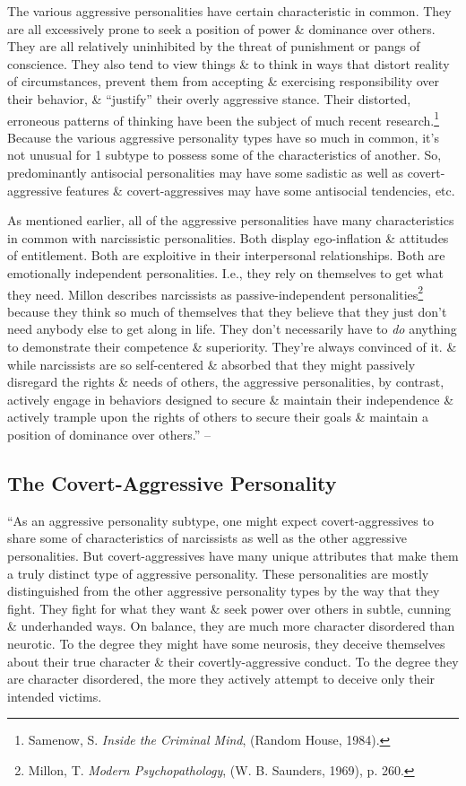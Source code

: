 \documentclass{article}
\numberwithin{equation}{section}
\begin{document}
The various aggressive personalities have certain characteristic in common. They are all excessively prone to seek a position of power \& dominance over others. They are all relatively uninhibited by the threat of punishment or pangs of conscience. They also tend to view things \& to think in ways that distort reality of circumstances, prevent them from accepting \& exercising responsibility over their behavior, \& ``justify'' their overly aggressive stance. Their distorted, erroneous patterns of thinking have been the subject of much recent research.\footnote{Samenow, S. \textit{Inside the Criminal Mind}, (Random House, 1984).} Because the various aggressive personality types have so much in common, it's not unusual for 1 subtype to possess some of the characteristics of another. So, predominantly antisocial personalities may have some sadistic as well as covert-aggressive features \& covert-aggressives may have some antisocial tendencies, etc.

As mentioned earlier, all of the aggressive personalities have many characteristics in common with narcissistic personalities. Both display ego-inflation \& attitudes of entitlement. Both are exploitive in their interpersonal relationships. Both are emotionally independent personalities. I.e., they rely on themselves to get what they need. Millon describes narcissists as passive-independent personalities\footnote{Millon, T. \textit{Modern Psychopathology}, (W. B. Saunders, 1969), p. 260.} because they think so much of themselves that they believe that they just don't need anybody else to get along in life. They don't necessarily have to \textit{do} anything to demonstrate their competence \& superiority. They're always convinced of it. \& while narcissists are so self-centered \& absorbed that they might passively disregard the rights \& needs of others, the aggressive personalities, by contrast, actively engage in behaviors designed to secure \& maintain their independence \& actively trample upon the rights of others to secure their goals \& maintain a position of dominance over others.'' -- \cite[pp. 35--39]{Simon2010}

\subsection{The Covert-Aggressive Personality}
``As an aggressive personality subtype, one might expect covert-aggressives to share some of characteristics of narcissists as well as the other aggressive personalities. But covert-aggressives have many unique attributes that make them a truly distinct type of aggressive personality. These personalities are mostly distinguished from the other aggressive personality types by the way that they fight. They fight for what they want \& seek power over others in subtle, cunning \& underhanded ways. On balance, they are much more character disordered than neurotic. To the degree they might have some neurosis, they deceive themselves about their true character \& their covertly-aggressive conduct. To the degree they are character disordered, the more they actively attempt to deceive only their intended victims.
\end{document}
